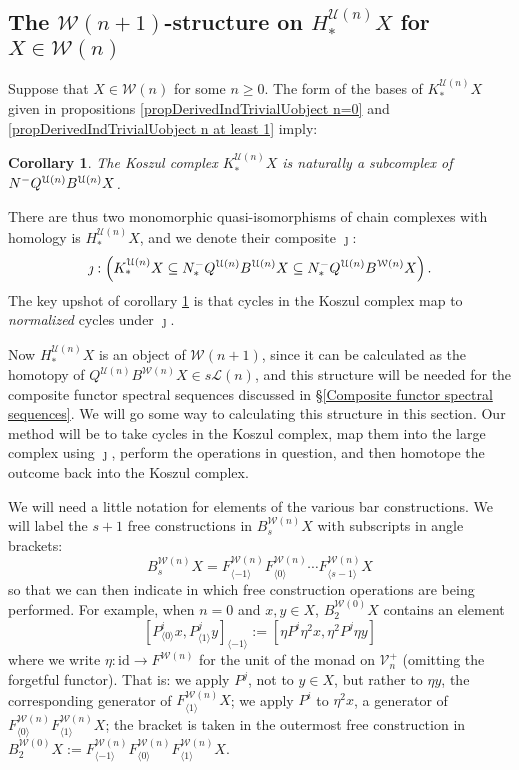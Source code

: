 \documentclass[11pt]{amsart} \renewcommand{\baselinestretch}{1.4}
\theoremstyle{plain}
\newtheorem{cor}[thm]{Corollary}
\theoremstyle{definition}
\renewcommand{\to}{\longrightarrow}
\newcommand{\calU}{\mathcal{U}}
\newcommand{\calL}{\mathcal{L}}
\newcommand{\calV}{\mathcal{V}}
\newcommand{\calw}{\mathcal{W}}
\newcommand{\vect}[2]{\calV^{#1}_{#2}}
\newcommand{\Nop}{N^{\smash{-}}}
\newcommand{\Id}{\mathrm{id}}
\begin{document}
\begin{Koszul complexes}
\subsection{The $\calw(n+1)$-structure on $H_*^{\calU(n)}X$ for $X\in\calw(n)$}\label{section on structure on homology of koszul cx}
Suppose that $X\in\calw(n)$ for some $n\geq0$. The form of the bases of $K_*^{\calU(n)}X$ given in propositions \ref{propDerivedIndTrivialUobject n=0} and \ref{propDerivedIndTrivialUobject n at least 1} imply:
\begin{cor}
\label{cycles in the Koszul complex are normalized cycles}
The Koszul complex $K_*^{\calU(n)}X$ is naturally a subcomplex of $\Nop Q^{\calU(n)}B^{\calU(n)}X$.
\end{cor}
\noindent  There are  thus two monomorphic quasi-isomorphisms of chain complexes with homology is $H_*^{\calU(n)}X$, and we denote their composite $\jmath$:
\[\jmath:\left(K_*^{\calU(n)}X\subseteq \Nop_*Q^{\calU(n)}B^{\calU(n)}X\subseteq \Nop_*Q^{\calU(n)}B^{\calw(n)}X\right).\]
The key upshot of corollary \ref{cycles in the Koszul complex are normalized cycles} is that cycles in the Koszul complex map to \emph{normalized} cycles under $\jmath$.

Now $H^{\calU(n)}_*X$ is an object of $\calw(n+1)$, since it can be calculated as the homotopy of $Q^{\calU(n)}B^{\calw(n)}X\in s\calL(n)$, and this  structure will be needed for the composite functor spectral sequences discussed in \S\ref{Composite functor spectral sequences}. We will go some way to calculating this structure in this section. Our method will be to take cycles in the Koszul complex, map them into the large complex using $\jmath$, perform the operations in question, and then homotope the outcome back into the Koszul complex.

We will need a little notation for elements of the various bar constructions. We will label the $s+1$ free constructions in $B^{\calw(n)}_{s}X$ with subscripts in angle brackets: 
\[B^{\calw(n)}_{s}X= F^{\calw(n)}_{\langle -1\rangle}F^{\calw(n)}_{\langle 0\rangle}\cdots F^{\calw(n)}_{\langle s-1\rangle}X\]%
so that we can then indicate in which free construction operations are being performed. For example, when $n=0$ and $x,y\in X$, $B_2^{\calw(0)}X$ contains an element
\[[P^i_{\langle 0\rangle}x,P^j_{\langle 1\rangle}y]_{\langle -1\rangle}:=[\eta P^i\eta^2 x,\eta^2P^j\eta y]\]%
where we write $\eta:\Id\to F^{\calw(n)}$ for the unit of the monad on $\vect{+}{n}$ (omitting the forgetful functor). That is: we apply $P^j$, not to $y\in X$, but rather to $\eta y$, the corresponding generator of $F^{\calw(n)}_{\langle 1\rangle}X$; we  apply $P^i$ to $\eta^2 x$, a generator of $F^{\calw(n)}_{\langle 0\rangle}F^{\calw(n)}_{\langle 1\rangle}X$; the bracket is taken in the outermost free construction in $B_2^{\calw(0)}X:=F^{\calw(n)}_{\langle -1\rangle}F^{\calw(n)}_{\langle 0\rangle}F^{\calw(n)}_{\langle 1\rangle}X$.%


\end{Koszul complexes}
\end{document}
